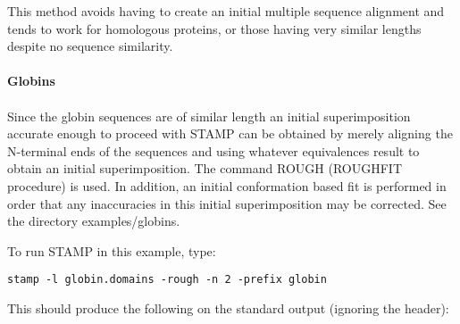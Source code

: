 This method avoids having to create an initial multiple sequence alignment and 
tends to work for homologous proteins, or those having very similar 
lengths despite no sequence similarity.\\
\\
{\bf Globins}\\
\\
Since the globin sequences are of similar length an initial
superimposition accurate enough to proceed with STAMP can be
obtained by merely aligning the N-terminal ends of the sequences
and using whatever equivalences result to obtain an initial 
superimposition.  The command ROUGH (ROUGHFIT procedure) is used.  In addition,
an initial conformation based fit is performed 
in order that any inaccuracies in this initial superimposition may be corrected.  
See the directory examples/globins.

To run STAMP in this example, type:

\begin{scriptsize}\begin{verbatim}
stamp -l globin.domains -rough -n 2 -prefix globin 
\end{verbatim} \end{scriptsize}

This should produce the following on the standard output (ignoring the header):\\

